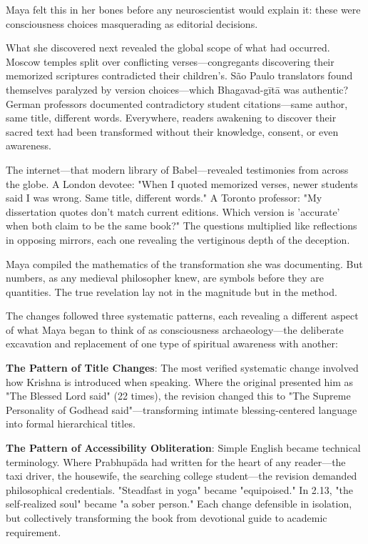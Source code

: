 \documentclass[12pt,twoside]{book}
\begin{document}
Maya felt this in her bones before any neuroscientist would explain it: these were consciousness choices masquerading as editorial decisions.

What she discovered next revealed the global scope of what had occurred. Moscow temples split over conflicting verses—congregants discovering their memorized scriptures contradicted their children's. São Paulo translators found themselves paralyzed by version choices—which Bhagavad-gītā was authentic? German professors documented contradictory student citations—same author, same title, different words. Everywhere, readers awakening to discover their sacred text had been transformed without their knowledge, consent, or even awareness.

The internet—that modern library of Babel—revealed testimonies from across the globe. A London devotee: "When I quoted memorized verses, newer students said I was wrong. Same title, different words." A Toronto professor: "My dissertation quotes don't match current editions. Which version is 'accurate' when both claim to be the same book?" The questions multiplied like reflections in opposing mirrors, each one revealing the vertiginous depth of the deception.

Maya compiled the mathematics of the transformation she was documenting. But numbers, as any medieval philosopher knew, are symbols before they are quantities. The true revelation lay not in the magnitude but in the method.

The changes followed three systematic patterns, each revealing a different aspect of what Maya began to think of as consciousness archaeology—the deliberate excavation and replacement of one type of spiritual awareness with another:

\textbf{\textbf{The Pattern of Title Changes}}: The most verified systematic change involved how Krishna is introduced when speaking. Where the original presented him as "The Blessed Lord said" (22 times), the revision changed this to "The Supreme Personality of Godhead said"—transforming intimate blessing-centered language into formal hierarchical titles.

\textbf{\textbf{The Pattern of Accessibility Obliteration}}: Simple English became technical terminology. Where Prabhupāda had written for the heart of any reader—the taxi driver, the housewife, the searching college student—the revision demanded philosophical credentials. "Steadfast in yoga" became "equipoised." In 2.13, "the self-realized soul" became "a sober person." Each change defensible in isolation, but collectively transforming the book from devotional guide to academic requirement.
\end{document}
